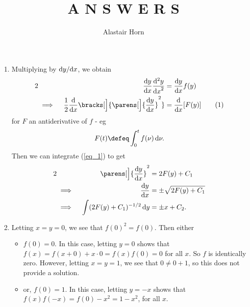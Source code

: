 \documentclass[a4paper,12pt,fleqn]{article}
\author{Alastair Horn}
\title{A N S W E R S}
\begin{document}
\maketitle

\begin{enumerate}
 \item

  Multiplying by \(\fdv<y>{x}\), we obtain
  \begin{alignat*}2
   && \dv<y>{x} \dv[2]<y>{x} &{}= \dv<y>{x}f(y) \\
   &\implies{}& \frac 12 \dv{x} \bracks[\Big]{\parens[\Big]{\dv<y>{x}}^2}
    &{}= \dv{x} [F(y)] \tag{1} \label{eq_1}
  \end{alignat*}
  for \(F\) an antiderivative of \(f\) - eg
  \begin{equation*}
   F(t) \defeq \integ[0]<t>{f(\nu)}{\nu}.
  \end{equation*}
  Then we can integrate (\ref{eq_1}) to get
  \begin{alignat*}2
   && \parens[\Big]{\dv<y>{x}}^2 &{}= 2F(y) + C_1 \\
   &\implies{}& \dv<y>{x} &{}= \pm \sqrt{2F(y) + C_1} \\
   &\implies{}& \integ{(2F(y) + C_1)^{-1/2}}{y} &{}= \pm x + C_2.
  \end{alignat*}
 \item

  Letting \(x = y = 0\), we see that \(f(0)^2 = f(0)\). Then either
  \begin{itemize}
   \item
    \(f(0) = 0\). In this case, letting \(y = 0\) shows that
    \(f(x) = f(x + 0) + x \cdot 0 =  f(x)f(0) = 0\) for all \(x\). So \(f\) is
    identically zero. However, letting \(x = y = 1\), we see that
    \(0 \ne 0 + 1\), so this does not provide a solution.
   \item
    or, \(f(0) = 1\). In this case, letting \(y = -x\) shows that
    \(f(x)f(-x) = f(0) - x^2 = 1 - x^2\), for all \(x\).


\end{itemize}
\end{enumerate}
\end{document}
